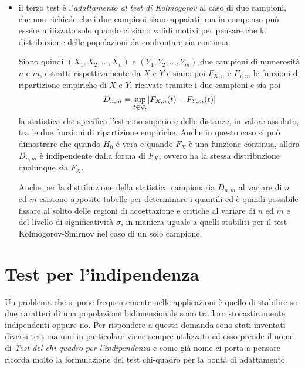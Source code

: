 \begin{itemize}
    \item il terzo test è l'\emph{adattamento al test di Kolmogorov} al caso di due campioni, che non richiede che 
          i due campioni siano appaiati, ma in compenso può essere utilizzato solo quando ci siano validi motivi per
          pensare che la distribuzione delle popolazioni da confrontare sia continua.

          Siano quindi $(X_1, X_2, \dots, X_n)$ e $(Y_1, Y_2, \dots, Y_m)$ due campioni di numerosità $n$ e $m$,
          estratti rispettivamente da $X$ e $Y$ e siano poi $F_{X, n}$ e $F_{Y, m}$ le funzioni di ripartizione
          empiriche di $X$ e $Y$, ricavate tramite i due campioni e sia poi
          \[ D_{n, m} = \sup _{t \in \R} |F_{X, n}(t) - F_{Y, m}(t)| \]
          la statistica che specifica l’estremo superiore delle distanze, in valore assoluto, tra le due funzioni
          di ripartizione empiriche.\newline
          Anche in questo caso si può dimostrare che quando $H_0$ è vera e quando $F_X$ è una funzione continua,
          allora $D _{n, m}$ è indipendente dalla forma di $F_X$, ovvero ha la stessa distribuzione qualunque sia $F_X$.

          Anche per la distribuzione della statistica campionaria $D _{n, m}$ al variare di $n$ ed $m$ esistono 
          apposite tabelle per determinare i quantili ed è quindi possibile fissare al solito delle regioni di
          accettazione e critiche al variare di $n$ ed $m$ e del livello di significatività $\sigma$, in maniera uguale
          a quelli stabiliti per il test Kolmogorov-Smirnov nel caso di un solo campione.
\end{itemize}

\section{Test per l'indipendenza}
Un problema che si pone frequentemente nelle applicazioni è quello di stabilire se due caratteri di una popolazione
bidimensionale sono tra loro stocasticamente indipendenti oppure no.\newline
Per rispondere a questa domanda sono stati inventati diversi test ma uno in particolare viene sempre utilizzato ed
esso prende il nome di \emph{Test del chi-quadro per l'indipendenza} e come già nome ci porta a pensare ricorda molto la
formulazione del test chi-quadro per la bontà di adattamento.

